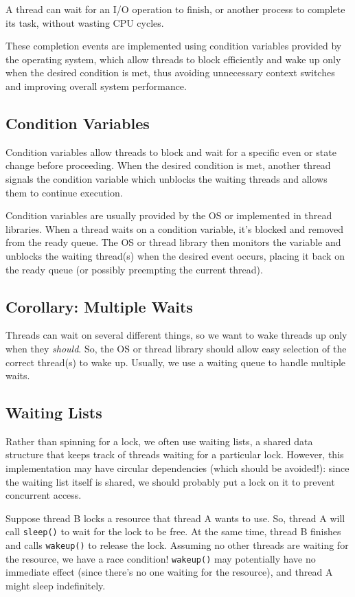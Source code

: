 \documentclass{report}
\newcommand{\exampleBegin}[1]{\begin{tcolorbox}[colback=blue!5!white,colframe=black!75!blue,title={Example:
      #1}]}
\newcommand{\exampleEnd}{\end{tcolorbox}}
\begin{document}
\exampleBegin{What to Do?}
A thread can wait for an I/O operation to finish, or another process to complete its task, without
wasting CPU cycles. 
\exampleEnd

These completion events are implemented using condition variables provided by
the operating system, which allow threads to block efficiently and wake up only when the desired
condition is met, thus avoiding unnecessary context switches and improving overall system performance.


\subsection{Condition Variables}
Condition variables allow threads to block and wait for a specific even or state change before
proceeding. When the desired condition is met, another thread signals the condition variable which
unblocks the waiting threads and allows them to continue execution.

Condition variables are usually provided by the OS or implemented in thread libraries. When a thread
waits on a condition variable, it's blocked and removed from the ready queue. The OS or thread
library then monitors the variable and unblocks the waiting thread(s) when the desired event occurs,
placing it back on the ready queue (or possibly preempting the current thread). 


\subsection*{Corollary: Multiple Waits}
Threads can wait on several different things, so we want to wake threads up only when they
\textit{should}. So, the OS or thread library should allow easy selection of the correct thread(s)
to wake up. Usually, we use a waiting queue to handle multiple waits.


\subsection{Waiting Lists}
Rather than spinning for a lock, we often use waiting lists, a shared data structure that keeps
track of threads waiting for a particular lock. However, this implementation may have circular
dependencies (which should be avoided!): since the waiting list itself is shared, we should probably
put a lock on it to prevent concurrent access.

\exampleBegin{Sleeping Beauty}
Suppose thread B locks a resource that thread A wants to use. So, thread A will call \texttt{sleep()} to
wait for the lock to be free. At the same time, thread B finishes and calls \texttt{wakeup()} to
release the lock. Assuming no other threads are waiting for the resource, we have a race condition!
\texttt{wakeup()} may potentially have no immediate effect (since there's no one waiting for the
resource), and thread A might sleep indefinitely.
\exampleEnd
\end{document}

